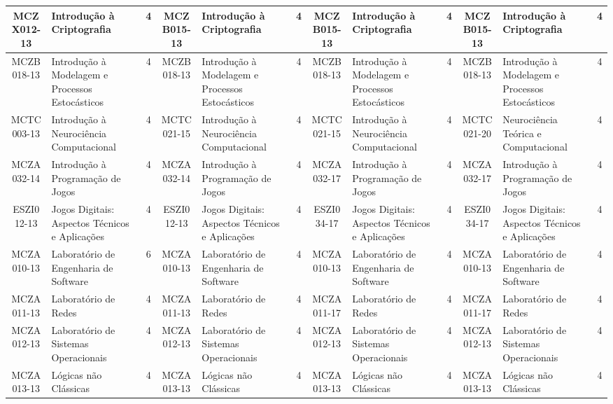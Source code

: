 \documentclass[a4paper]{article}
\begin{document}
\begin{landscape}
{\begin{longtable}{|c|p{.2\textheight}|c||c|p{.2\textheight}|c||c|p{.2\textheight}|c||c|p{.2\textheight}|c|}
MCZX012-13 & Introdução à Criptografia & 4 &
MCZB015-13 & Introdução à Criptografia & 4 &
MCZB015-13 & Introdução à Criptografia & 4 & 
MCZB015-13 & Introdução à Criptografia & 4\\ \hline

MCZB018-13 & Introdução à Modelagem e Processos Estocásticos & 4 &
MCZB018-13 & Introdução à Modelagem e Processos Estocásticos & 4 &
MCZB018-13 & Introdução à Modelagem e Processos Estocásticos & 4 &
MCZB018-13 & Introdução à Modelagem e Processos Estocásticos & 4\\ \hline

MCTC003-13 & Introdução à Neurociência Computacional & 4 &
MCTC021-15 & Introdução à Neurociência Computacional & 4 &
MCTC021-15 & Introdução à Neurociência Computacional & 4 & 
MCTC021-20 & Neurociência Teórica e Computacional    & 4\\ \hline

MCZA032-14 & Introdução à Programação de Jogos & 4 &
MCZA032-14 & Introdução à Programação de Jogos & 4 &
MCZA032-17 & Introdução à Programação de Jogos & 4 &
MCZA032-17 & Introdução à Programação de Jogos & 4\\ \hline

ESZI012-13 & Jogos Digitais: Aspectos Técnicos e Aplicações & 4 &
ESZI012-13 & Jogos Digitais: Aspectos Técnicos e Aplicações & 4 &
ESZI034-17 & Jogos Digitais: Aspectos Técnicos e Aplicações & 4 &
ESZI034-17 & Jogos Digitais: Aspectos Técnicos e Aplicações & 4\\ \hline

MCZA010-13 & Laboratório de Engenharia de Software & 6 &
MCZA010-13 & Laboratório de Engenharia de Software & 4 &
MCZA010-13 & Laboratório de Engenharia de Software & 4 &
MCZA010-13 & Laboratório de Engenharia de Software & 4\\ \hline

MCZA011-13 & Laboratório de Redes & 4 &
MCZA011-13 & Laboratório de Redes & 4 &
MCZA011-17 & Laboratório de Redes & 4 &
MCZA011-17 & Laboratório de Redes & 4\\ \hline

MCZA012-13 & Laboratório de Sistemas Operacionais & 4 &
MCZA012-13 & Laboratório de Sistemas Operacionais & 4 &
MCZA012-13 & Laboratório de Sistemas Operacionais & 4 & 
MCZA012-13 & Laboratório de Sistemas Operacionais & 4\\ \hline

MCZA013-13 & Lógicas não Clássicas & 4 &
MCZA013-13 & Lógicas não Clássicas & 4 &
MCZA013-13 & Lógicas não Clássicas & 4 &
MCZA013-13 & Lógicas não Clássicas & 4\\ \hline


\end{longtable}}
\end{landscape}
\end{document}
